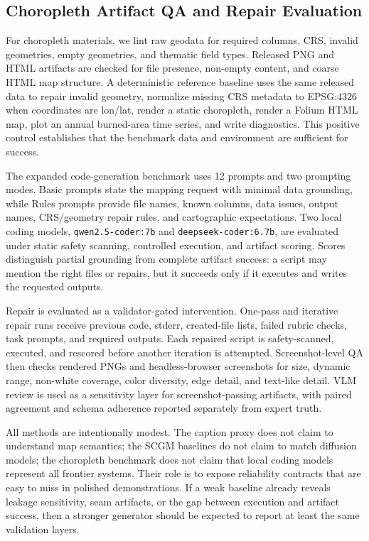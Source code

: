 \documentclass[]{interact}
\begin{document}
\subsection{Choropleth Artifact QA and Repair Evaluation}

For choropleth materials, we lint raw geodata for required columns, CRS, invalid geometries, empty geometries, and thematic field types. Released PNG and HTML artifacts are checked for file presence, non-empty content, and coarse HTML map structure. A deterministic reference baseline uses the same released data to repair invalid geometry, normalize missing CRS metadata to EPSG:4326 when coordinates are lon/lat, render a static choropleth, render a Folium HTML map, plot an annual burned-area time series, and write diagnostics. This positive control establishes that the benchmark data and environment are sufficient for success.

The expanded code-generation benchmark uses 12 prompts and two prompting modes. Basic prompts state the mapping request with minimal data grounding, while Rules prompts provide file names, known columns, data issues, output names, CRS/geometry repair rules, and cartographic expectations. Two local coding models, \texttt{qwen2.5-coder:7b} and \texttt{deepseek-coder:6.7b}, are evaluated under static safety scanning, controlled execution, and artifact scoring. Scores distinguish partial grounding from complete artifact success: a script may mention the right files or repairs, but it succeeds only if it executes and writes the requested outputs.

Repair is evaluated as a validator-gated intervention. One-pass and iterative repair runs receive previous code, stderr, created-file lists, failed rubric checks, task prompts, and required outputs. Each repaired script is safety-scanned, executed, and rescored before another iteration is attempted. Screenshot-level QA then checks rendered PNGs and headless-browser screenshots for size, dynamic range, non-white coverage, color diversity, edge detail, and text-like detail. VLM review is used as a sensitivity layer for screenshot-passing artifacts, with paired agreement and schema adherence reported separately from expert truth.

All methods are intentionally modest. The caption proxy does not claim to understand map semantics; the SCGM baselines do not claim to match diffusion models; the choropleth benchmark does not claim that local coding models represent all frontier systems. Their role is to expose reliability contracts that are easy to miss in polished demonstrations. If a weak baseline already reveals leakage sensitivity, seam artifacts, or the gap between execution and artifact success, then a stronger generator should be expected to report at least the same validation layers.
\end{document}
